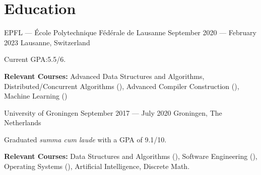 \section*{Education}

\begin{cventries}
{EPFL --- École Polytechnique Fédérale de Lausanne} %
{September 2020 --- February 2023} %
{Lausanne, Switzerland} %
{%
  \begin{cvitems}
    \item Current GPA:\@ 5.5/6.
    \item \textbf{Relevant Courses:} Advanced Data Structures and Algorithms, Distributed/Concurrent Algorithms (), Advanced Compiler Construction (), Machine Learning ()
  \end{cvitems}
}
{University of Groningen}  %
{September 2017 --- July 2020} %
{Groningen, The Netherlands} %
{%
  \begin{cvitems}
    \item Graduated \textit{summa cum laude} with a GPA of 9.1/10.
    \item \textbf{Relevant Courses:} Data Structures and Algorithms (), Software Engineering (), Operating Systems (), Artificial Intelligence,  Discrete Math.
  \end{cvitems}
}
\end{cventries}
